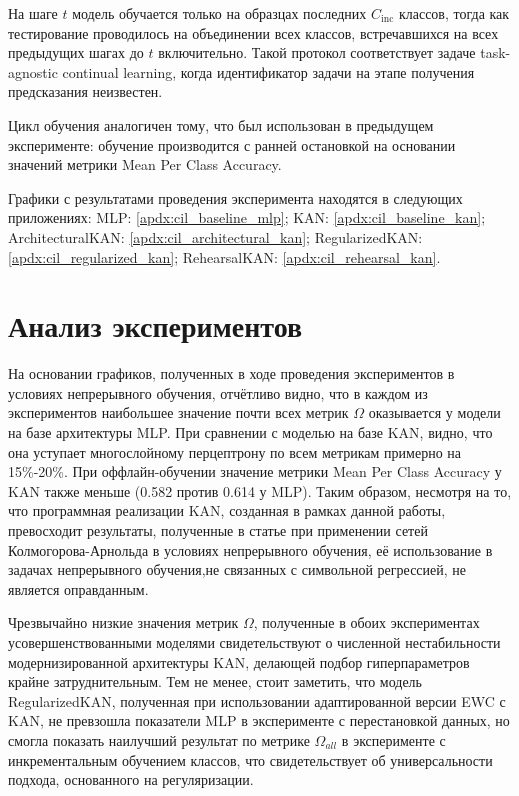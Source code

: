 \documentclass[a4paper,14pt]{extarticle}
\begin{document}
На шаге \(t\) модель обучается только на образцах последних
\(C_{\text{inc}}\) классов, тогда как тестирование проводилось на объединении
всех классов, встречавшихся на всех предыдущих шагах до \(t\) включительно.
Такой протокол соответствует задаче task-agnostic continual learning, когда
идентификатор задачи на этапе получения предсказания неизвестен.

Цикл обучения аналогичен тому, что был использован в предыдущем эксперименте:
обучение производится с ранней остановкой на основании значений метрики Mean Per
Class Accuracy.

Графики с результатами проведения эксперимента находятся в следующих приложениях:
MLP: \ref{apdx:cil_baseline_mlp}; KAN: \ref{apdx:cil_baseline_kan};
ArchitecturalKAN: \ref{apdx:cil_architectural_kan}; RegularizedKAN:
\ref{apdx:cil_regularized_kan}; RehearsalKAN: \ref{apdx:cil_rehearsal_kan}.


\section{Анализ экспериментов}
На основании графиков, полученных в ходе проведения экспериментов в условиях
непрерывного обучения, отчётливо видно, что в каждом из экспериментов
наибольшее значение почти всех метрик \(\Omega\) оказывается у модели на базе
архитектуры MLP. При сравнении с моделью на базе KAN, видно, что она
уступает многослойному перцептрону по всем метрикам примерно на 15\%-20\%.
При оффлайн-обучении значение метрики Mean Per Class Accuracy у KAN
также меньше (0.582 против 0.614 у MLP). Таким образом, несмотря на то, что
программная реализации KAN, созданная в рамках данной работы, превосходит
результаты, полученные в статье \cite{yu2024kan} при применении сетей
Колмогорова-Арнольда в условиях непрерывного обучения, её использование в задачах
непрерывного обучения,не связанных с символьной регрессией, не является оправданным.

Чрезвычайно низкие значения метрик \(\Omega\), полученные в обоих экспериментах
усовершенствованными моделями свидетельствуют о численной нестабильности
модернизированной архитектуры KAN, делающей подбор гиперпараметров
крайне затруднительным. Тем не менее, стоит заметить, что модель RegularizedKAN,
полученная при использовании адаптированной версии EWC с KAN,  не превзошла
показатели MLP в эксперименте с перестановкой данных, но смогла показать наилучший
результат по метрике \(\Omega_{all}\) в эксперименте с инкрементальным обучением классов, 
что свидетельствует об универсальности подхода, основанного на регуляризации.
\end{document}
